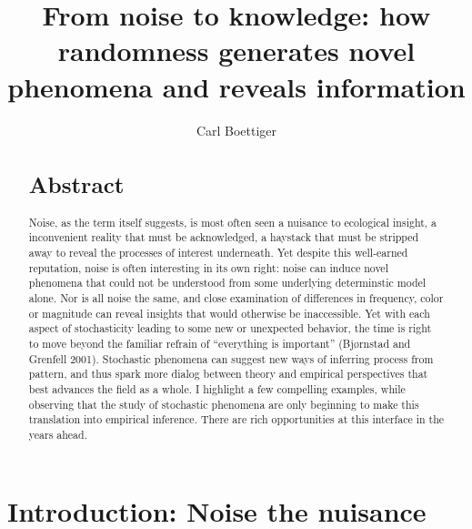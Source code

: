 \documentclass[3p]{elsarticle} %
\begin{document}
\begin{frontmatter}

  \title{From noise to knowledge: how randomness generates novel phenomena and
reveals information}
    \author[a]{Carl Boettiger}
  
      \address[a]{Dept of Environmental Science, Policy, and Management, University of
California Berkeley, Berkeley CA 94720-3114, USA}
  
  \begin{abstract}
  \hypertarget{abstract}{%
  \section{Abstract}\label{abstract}}
  
  Noise, as the term itself suggests, is most often seen a nuisance to
  ecological insight, a inconvenient reality that must be acknowledged, a
  haystack that must be stripped away to reveal the processes of interest
  underneath. Yet despite this well-earned reputation, noise is often
  interesting in its own right: noise can induce novel phenomena that
  could not be understood from some underlying determinstic model alone.
  Nor is all noise the same, and close examination of differences in
  frequency, color or magnitude can reveal insights that would otherwise
  be inaccessible. Yet with each aspect of stochasticity leading to some
  new or unexpected behavior, the time is right to move beyond the
  familiar refrain of ``everything is important'' (Bjørnstad and Grenfell
  2001). Stochastic phenomena can suggest new ways of inferring process
  from pattern, and thus spark more dialog between theory and empirical
  perspectives that best advances the field as a whole. I highlight a few
  compelling examples, while observing that the study of stochastic
  phenomena are only beginning to make this translation into empirical
  inference. There are rich opportunities at this interface in the years
  ahead.\\
  \end{abstract}
  
 \end{frontmatter}

\newpage

\hypertarget{introduction-noise-the-nuisance}{%
\section{Introduction: Noise the
nuisance}\label{introduction-noise-the-nuisance}}
\end{document}
